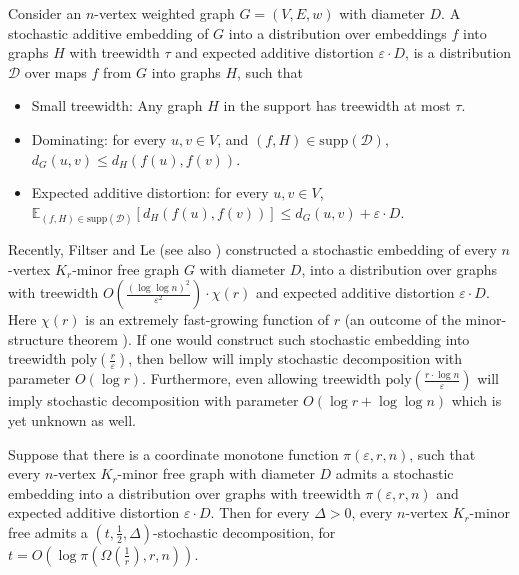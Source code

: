 \documentclass{article}
\newcommand{\poly}{\mathrm{poly}}
\newcommand{\supp}{\mathrm{supp}}
\newcommand{\calD}{\mathcal{D}}
\newcommand{\E}{{\mathbb{E}}}
\def\eps{\varepsilon}
\begin{document}
\begin{definition} Consider an $n$-vertex weighted graph $G=(V,E,w)$ with diameter $D$. A
	stochastic additive embedding of $G$ into a distribution over embeddings $f$ into graphs $H$ with treewidth $\tau$ and expected additive distortion $\eps\cdot D$, is a distribution $\calD$ over maps $f$ from $G$ into graphs $H$, such that
	\begin{itemize}
		\item Small treewidth: Any graph $H$ in the support has treewidth at most $\tau$.
		\item Dominating: for every $u, v\in V$, and $(f,H)\in\supp(\calD)$, $d_G(u, v)\le d_H(f(u),f(v))$.
		\item Expected additive distortion: for every $u, v\in V$, $\E_{(f,H)\in\supp(\calD)}\left[d_H(f(u),f(v))\right]\le d_G(u,v)+\eps\cdot D$.
	\end{itemize}  
\end{definition}
Recently, Filtser and Le \cite{FL22} (see also \cite{FKS19,CFKL20,FL21}) constructed a stochastic embedding of every $n$-vertex $K_r$-minor free graph $G$ with diameter $D$, into a distribution over graphs with treewidth $O(\frac{(\log\log n)^2}{\eps^2})\cdot \chi(r)$ and expected additive distortion $\eps\cdot D$. Here $\chi(r)$ is an extremely fast-growing function of $r$ (an outcome of the minor-structure theorem \cite{RS03}). 
If one would construct such stochastic embedding into treewidth $\poly(\frac r\eps)$, then  bellow will imply stochastic decomposition with parameter $O(\log r)$. Furthermore, even allowing treewidth $\poly(\frac {r\cdot\log n}{\eps})$ will imply stochastic decomposition with parameter $O(\log r+\log\log n)$ which is yet unknown as well.
\begin{lemma}\label{lem:AdditiveEmbeddingToDecomposition}
	Suppose that there is a coordinate monotone function $\pi(\eps,r,n)$, such that every $n$-vertex $K_r$-minor free graph with diameter $D$ admits a stochastic embedding into a distribution over graphs with treewidth $\pi(\eps,r,n)$ and expected additive distortion $\eps\cdot D$.
	Then for every $\Delta>0$, every $n$-vertex $K_r$-minor free admits a $(t,\frac12,\Delta)$-stochastic decomposition, for $t=O(\log\pi(\Omega(\frac{1}{r}),r,n))$.
\end{lemma}
\end{document}
